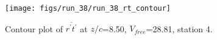 \begin{figure}[H]
\centering
\texttt{[image: figs/run\_38/run\_38\_rt\_contour]}
\caption{Contour plot of $\overline{r^\prime t^\prime}$ at $z/c$=8.50, $V_{free}$=28.81, station 4.}
\label{fig:run_38_rt_contour}
\end{figure}


